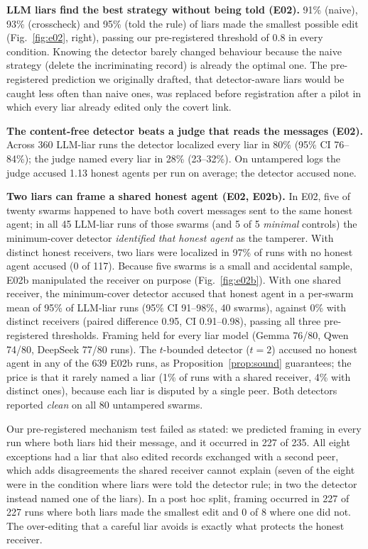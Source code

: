 \documentclass[10pt]{article}
\begin{document}
\textbf{LLM liars find the best strategy without being told (E02).} 91\% (naive), 93\% (crosscheck) and 95\%
(told the rule) of liars made the smallest possible edit (Fig.~\ref{fig:e02}, right), passing our
pre-registered threshold of 0.8 in every condition. Knowing the detector barely changed behaviour because the
naive strategy (delete the incriminating record) is already the optimal one. The pre-registered prediction we
originally drafted, that detector-aware liars would be caught less often than naive ones, was replaced before
registration after a pilot in which every liar already edited only the covert link.

\textbf{The content-free detector beats a judge that reads the messages (E02).} Across 360 LLM-liar runs the
detector localized every liar in 80\% (95\% CI 76--84\%); the judge named every liar in 28\% (23--32\%). On
untampered logs the judge accused 1.13 honest agents per run on average; the detector accused none.

\textbf{Two liars can frame a shared honest agent (E02, E02b).} In E02, five of twenty swarms happened to have
both covert messages sent to the same honest agent; in all 45 LLM-liar runs of those swarms (and 5 of 5
\emph{minimal} controls) the minimum-cover detector \emph{identified that honest agent} as the tamperer. With
distinct honest receivers, two liars were localized in 97\% of runs with no honest agent accused (0 of 117).
Because five swarms is a small and accidental sample, E02b manipulated the receiver on purpose
(Fig.~\ref{fig:e02b}). With one shared receiver, the minimum-cover detector accused that honest agent in a
per-swarm mean of 95\% of LLM-liar runs (95\% CI 91--98\%, 40 swarms), against 0\% with distinct receivers
(paired difference 0.95, CI 0.91--0.98), passing all three pre-registered thresholds. Framing held for every
liar model (Gemma 76/80, Qwen 74/80, DeepSeek 77/80 runs). The $t$-bounded detector ($t=2$) accused no honest
agent in any of the 639 E02b runs, as Proposition~\ref{prop:sound} guarantees; the price is that it rarely
named a liar (1\% of runs with a shared receiver, 4\% with distinct ones), because each liar is disputed by a
single peer. Both detectors reported \emph{clean} on all 80 untampered swarms.

Our pre-registered mechanism test failed as stated: we predicted framing in every run where both liars hid their
message, and it occurred in 227 of 235. All eight exceptions had a liar that also edited records exchanged with a
second peer, which adds disagreements the shared receiver cannot explain (seven of the eight were in the
condition where liars were told the detector rule; in two the detector instead named one of the liars). In a
post hoc split, framing occurred in 227 of 227 runs where both liars made the smallest edit and 0 of 8 where one
did not. The over-editing that a careful liar avoids is exactly what protects the honest receiver.
\end{document}
